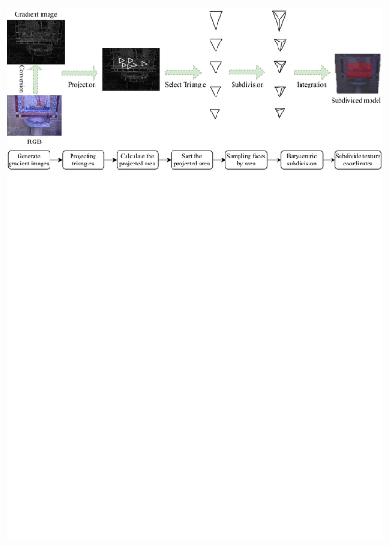 \begin{figure}[ht]
    \centering
    \includegraphics[width=1.0\columnwidth]{pic/work2/mesh_subdivision.pdf}

    
    \label{fig:subdivion}
\end{figure}

